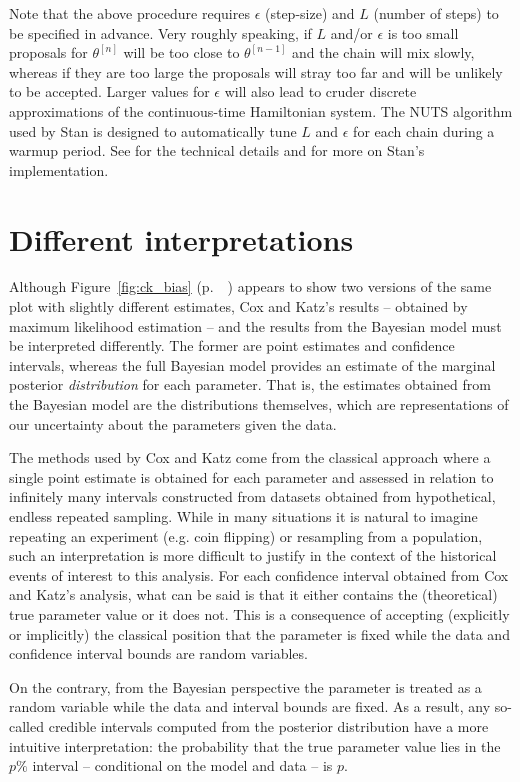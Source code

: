 Note that the above procedure requires $\epsilon$ (step-size) and $L$ (number of steps) to be specified in 
advance. Very roughly speaking, if $L$ and/or $\epsilon$ is too small proposals for $\theta^{[n]}$ will be too 
close to $\theta^{[n-1]}$ and the chain will mix slowly, whereas if they are too large the proposals will stray 
too far and will be unlikely to be accepted. Larger values for $\epsilon$ will also lead to cruder discrete
approximations of the continuous-time Hamiltonian system. The NUTS algorithm  
used by Stan is designed to automatically tune $L$ and $\epsilon$ for each chain during a warmup period. 
See  for the technical details and  for more 
on Stan's implementation. 




\clearpage
\section[Different Interpretations]{Different interpretations}\label{AppendixE}

Although Figure~\ref{fig:ck_bias} (p.~~\pageref{fig:ck_bias}) appears to show two versions of the same plot with
slightly different estimates, Cox and Katz's results -- obtained by maximum likelihood estimation --
and the results from the Bayesian model must be interpreted differently. The former are point estimates 
and confidence intervals, whereas the full Bayesian model provides an estimate of the marginal posterior 
{\it distribution} for each parameter. That is, the estimates obtained from the Bayesian model are the 
distributions themselves, which are representations of our uncertainty about the parameters 
given the data. 

The methods used by Cox and Katz come from the classical approach where a single point 
estimate is obtained for each parameter and assessed in relation to infinitely many intervals 
constructed from datasets obtained from hypothetical, endless repeated sampling. While in many 
situations it is natural to imagine repeating an experiment (e.g. coin flipping) or resampling from 
a population, such an interpretation is more difficult to justify in the context of the historical 
events of interest to this analysis. For each confidence interval obtained from Cox and Katz's analysis, 
what can be said is that it either contains the (theoretical) true parameter value or it does not. This is 
a consequence of accepting (explicitly or implicitly) the classical position that the parameter is fixed 
while the data and confidence interval bounds are random variables. 

On the contrary, from the Bayesian perspective the parameter is treated as a random variable while 
the data and interval bounds are fixed. As a result, any so-called credible intervals computed from the 
posterior distribution have a more intuitive interpretation: the probability that the true parameter value lies 
in the $p\%$ interval  -- conditional on the model and data -- is $p$. 



